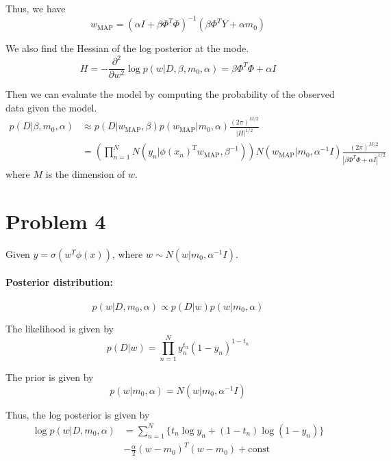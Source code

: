 \documentclass[a4paper,12pt]{article}
\begin{document}
Thus, we have
\begin{equation*}
	w_\text{MAP} = (\alpha I + \beta \Phi^T \Phi)^{-1} (\beta \Phi^T Y + \alpha m_0)
\end{equation*}

We also find the Hessian of the log posterior at the mode.
\begin{equation*}
	H = - \frac{\partial^2}{\partial w^2} \log p(w|D, \beta, m_0, \alpha) = \beta \Phi^T \Phi + \alpha I
\end{equation*}

Then we can evaluate the model by computing the probability of the observed data given the model.
\begin{align*}
	p(D|\beta, m_0, \alpha) &\approx p(D|w_\text{MAP}, \beta) p(w_\text{MAP}|m_0, \alpha) \frac{(2\pi)^{M/2}}{|H|^{1/2}} \\
	&= \left( \prod_{n=1}^{N} N(y_n|\phi(x_n)^T w_\text{MAP}, \beta^{-1}) \right) N(w_\text{MAP}|m_0, \alpha^{-1} I) \frac{(2\pi)^{M/2}}{|\beta \Phi^T \Phi + \alpha I|^{1/2}}
\end{align*}
where $M$ is the dimension of $w$.

\section*{Problem 4}

Given $y = \sigma(w^T \phi(x))$, where $w \sim N(w|m_0, \alpha^{-1} I)$.

\paragraph{Posterior distribution:}
\begin{equation*}
	p(w|D, m_0, \alpha) \propto p(D|w) p(w|m_0, \alpha)
\end{equation*}

The likelihood is given by
\begin{equation*}
	p(D|w) = \prod_{n=1}^{N} y_n^{t_n} (1 - y_n)^{1 - t_n}
\end{equation*}

The prior is given by
\begin{equation*}
	p(w|m_0, \alpha) = N(w|m_0, \alpha^{-1} I)
\end{equation*}

Thus, the log posterior is given by
\begin{align*}
	\log p(w|D, m_0, \alpha) &= \sum_{n=1}^{N} \{t_n \log y_n + (1 - t_n) \log (1 - y_n)\} \\
	&- \frac{\alpha}{2} (w - m_0)^T (w - m_0) + \text{const}
\end{align*}
\end{document}
